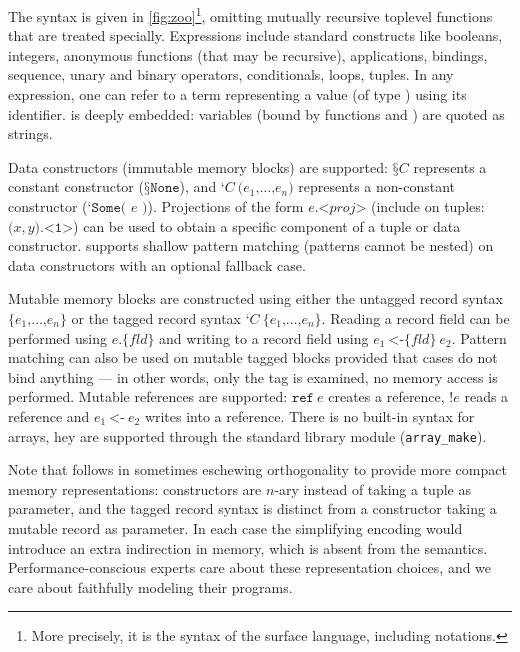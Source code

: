 

The \ZooLang syntax is given in \cref{fig:zoo}\footnote{More precisely, it is the syntax of the surface language, including \Rocq notations.}, omitting mutually recursive toplevel functions that are treated specially.
Expressions include standard constructs like booleans, integers, anonymous functions (that may be recursive), applications,  bindings, sequence, unary and binary operators, conditionals,  loops, tuples.
In any expression, one can refer to a \Rocq term representing a \ZooLang value (of type ) using its \Rocq identifier.
\ZooLang is deeply embedded: variables (bound by functions and ) are quoted as strings.

Data constructors (immutable memory blocks) are supported: $\texttt{§}C$ represents a constant constructor (\eg $\texttt{§}\texttt{None}$), and $\texttt{‘} C\ \texttt{(} e_1 \texttt{,} \dots \texttt{,} e_n \texttt{)}$ represents a non-constant constructor (\eg $\texttt{‘} \texttt{Some( } e \texttt{ )}$).
Projections of the form $e \texttt{.<} \mathit{proj} \texttt{>}$ (include on tuples: $\texttt{(} x, y \texttt{).<1>}$) can be used to obtain a specific component of a tuple or data constructor.
\ZooLang supports shallow pattern matching (patterns cannot be nested) on data constructors with an optional fallback case.

Mutable memory blocks are constructed using either the untagged record syntax $\texttt{\{} e_1 \texttt{,} \dots \texttt{,} e_n \texttt{\}}$ or the tagged record syntax $\texttt{‘} C\ \texttt{\{} e_1 \texttt{,} \dots \texttt{,} e_n \texttt{\}}$.
Reading a record field can be performed using $e \texttt{.\{} \mathit{fld} \texttt{\}}$ and writing to a record field using $e_1\ \texttt{<-\{} \mathit{fld} \texttt{\}}\ e_2$.
Pattern matching can also be used on mutable tagged blocks provided that cases do not bind anything --- in other words, only the tag is examined, no memory access is performed.
Mutable references are supported: $\texttt{ref}\ e$ creates a reference, $\texttt{!} e$ reads a reference and $e_1\ \texttt{<-}\ e_2$ writes into a reference.
There is no built-in syntax for arrays, hey are supported through the  standard library module (\eg \texttt{array\_make}).

Note that \ZooLang follows \OCaml in sometimes eschewing orthogonality to provide more compact memory representations: constructors are $n$-ary instead of taking a tuple as parameter, and the tagged record syntax is distinct from a constructor taking a mutable record as parameter. In each case the simplifying encoding would introduce an extra indirection in memory, which is absent from the \ZooLang semantics. Performance-conscious experts care about these representation choices, and we care about faithfully modeling their programs.

